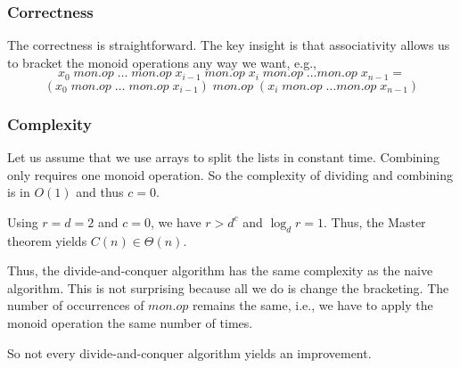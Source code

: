 \subsubsection{Correctness}

The correctness is straightforward.
The key insight is that associativity allows us to bracket the monoid operations any way we want, e.g.,
\[x_0 \;mon.op\;\ldots \;mon.op\; x_{i-1} \;mon.op\; x_i \;mon.op\; \ldots mon.op\; x_{n-1} =\]
\[(x_0 \;mon.op\; \ldots \;mon.op\; x_{i-1}) \;mon.op\; (x_i \;mon.op\; \ldots mon.op\; x_{n-1}) \]

\subsubsection{Complexity}

Let us assume that we use arrays to split the lists in constant time.
Combining only requires one monoid operation.
So the complexity of dividing and combining is in $O(1)$ and thus $c=0$.

Using $r=d=2$ and $c=0$, we have $r>d^c$ and $\log_d r=1$.
Thus, the Master theorem yields $C(n)\in\Theta(n)$.

Thus, the divide-and-conquer algorithm has the same complexity as the naive algorithm.
This is not surprising because all we do is change the bracketing.
The number of occurrences of $mon.op$ remains the same, i.e., we have to apply the monoid operation the same number of times.

So not every divide-and-conquer algorithm yields an improvement.